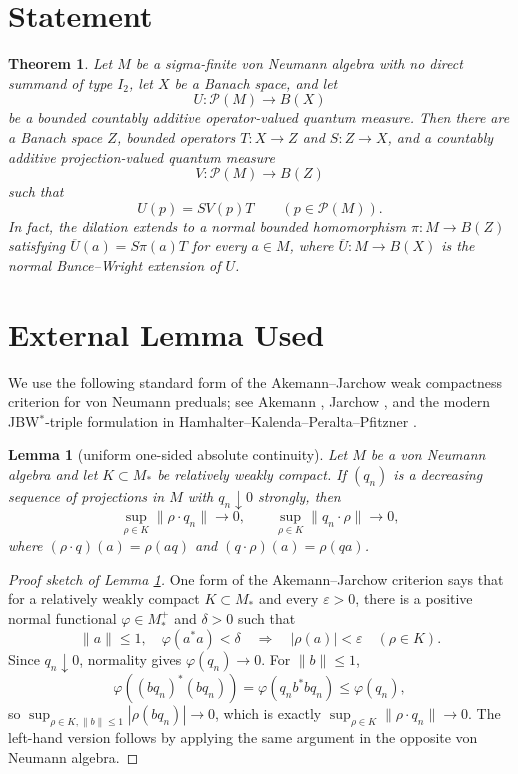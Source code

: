 \documentclass[11pt]{article}
\newtheorem{theorem}{Theorem}
\newtheorem{lemma}{Lemma}
\newcommand{\cP}{\mathcal P}
\begin{document}
\section*{Statement}

\begin{theorem}
Let \(M\) be a sigma-finite von Neumann algebra with no direct summand of type
\(I_2\), let \(X\) be a Banach space, and let
\[
        U:\cP(M)\longrightarrow B(X)
\]
be a bounded countably additive operator-valued quantum measure.  Then there are
a Banach space \(Z\), bounded operators \(T:X\to Z\) and \(S:Z\to X\), and a
countably additive projection-valued quantum measure
\[
        V:\cP(M)\longrightarrow B(Z)
\]
such that
\[
        U(p)=S V(p)T\qquad (p\in\cP(M)).
\]
In fact, the dilation extends to a normal bounded homomorphism
\(\pi:M\to B(Z)\) satisfying \(\overline U(a)=S\pi(a)T\) for every \(a\in M\),
where \(\overline U:M\to B(X)\) is the normal Bunce--Wright extension of \(U\).
\end{theorem}

\section*{External Lemma Used}

We use the following standard form of the Akemann--Jarchow weak compactness
criterion for von Neumann preduals; see Akemann \cite{Akemann}, Jarchow
\cite{Jarchow}, and the modern JBW\(^*\)-triple formulation in
Hamhalter--Kalenda--Peralta--Pfitzner \cite[Theorem 11.3]{HKPP}.

\begin{lemma}[uniform one-sided absolute continuity]\label{lem:uniform}
Let \(M\) be a von Neumann algebra and let \(K\subset M_*\) be relatively weakly
compact.  If \((q_n)\) is a decreasing sequence of projections in \(M\) with
\(q_n\downarrow0\) strongly, then
\[
        \sup_{\rho\in K}\|\rho\cdot q_n\|\longrightarrow0,
        \qquad
        \sup_{\rho\in K}\|q_n\cdot\rho\|\longrightarrow0,
\]
where \((\rho\cdot q)(a)=\rho(aq)\) and \((q\cdot\rho)(a)=\rho(qa)\).
\end{lemma}

\begin{proof}[Proof sketch of Lemma \ref{lem:uniform}]
One form of the Akemann--Jarchow criterion says that for a relatively weakly
compact \(K\subset M_*\) and every \(\varepsilon>0\), there is a positive normal
functional \(\varphi\in M_*^+\) and \(\delta>0\) such that
\[
        \|a\|\leq1,\quad \varphi(a^*a)<\delta
        \quad\Longrightarrow\quad
        |\rho(a)|<\varepsilon\quad(\rho\in K).
\]
Since \(q_n\downarrow0\), normality gives \(\varphi(q_n)\to0\).  For
\(\|b\|\leq1\),
\[
        \varphi((bq_n)^*(bq_n))=\varphi(q_n b^*b q_n)\leq \varphi(q_n),
\]
so \(\sup_{\rho\in K,\|b\|\leq1}|\rho(bq_n)|\to0\), which is exactly
\(\sup_{\rho\in K}\|\rho\cdot q_n\|\to0\).  The left-hand version follows by
applying the same argument in the opposite von Neumann algebra.
\end{proof}
\end{document}
